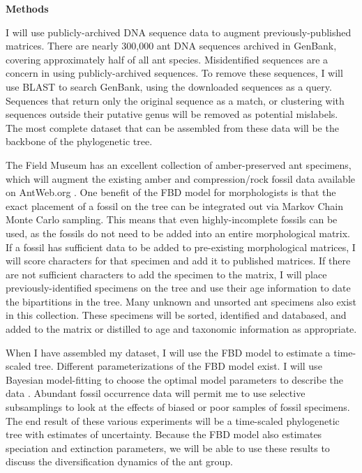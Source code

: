 \documentclass[]{article}
\begin{document}
\textbf{Methods} \par
I will use publicly-archived DNA sequence data to augment previously-published matrices. There are nearly 300,000 ant DNA sequences archived in GenBank, covering approximately half of all ant species. Misidentified sequences are a concern in using publicly-archived sequences. To remove these sequences, I will use BLAST \citep{altschul1990basic} to search GenBank, using the  downloaded sequences as a query. Sequences that return only the original sequence as a match, or clustering with sequences outside their putative genus will be removed as potential mislabels. The most complete dataset that can be assembled from these data will be the backbone of the phylogenetic tree.  \par
The Field Museum has an excellent collection of amber-preserved ant specimens, which will augment the existing amber and compression/rock fossil data available on AntWeb.org \citep{ ref87}. One benefit of the FBD model for morphologists is that the exact placement of a fossil on the tree can be integrated out via Markov Chain Monte Carlo sampling. This means that even highly-incomplete fossils can be used, as the fossils do not need to be added into an entire morphological matrix. If a fossil has sufficient data to be added to pre-existing morphological matrices,  I will score characters for that specimen and add it to published matrices. If there are not sufficient characters to add the specimen to the matrix, I will place previously-identified specimens on the tree and use their age information to date the bipartitions in the tree. Many unknown and unsorted ant specimens also exist in this collection. These specimens will be sorted, identified and databased, and added to the matrix or distilled to age and taxonomic information as appropriate.  \par
When I have assembled my dataset, I will use the FBD model to estimate a time-scaled tree. Different parameterizations of the FBD model exist. I will use Bayesian model-fitting to choose the optimal model parameters to describe the data \citep{baele2012improving}. Abundant fossil occurrence data will permit me to use selective subsamplings to look at the effects of biased or poor samples of fossil specimens.  The end result of these various experiments will be a time-scaled phylogenetic tree with estimates of uncertainty. Because the FBD model also estimates speciation and extinction parameters, we will be able to use these results to discuss the diversification dynamics of the ant group. \par
\end{document}
